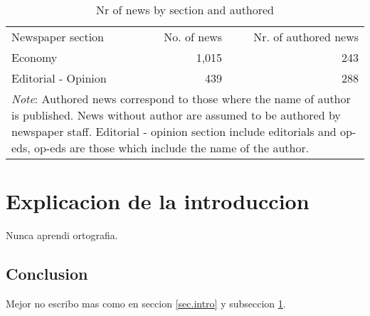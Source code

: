 \documentclass[13pt]{article}
\begin{document}
    \begin{table}[t]
        \centering
        \caption[Nr of news by section and authored]{Nr of news by section and authored}
        \begin{tabular}{lrr}
        \hline
        Newspaper section & No. of news & Nr. of authored news \\
        Economy & 1,015 & 243 \\
        Editorial - Opinion & 439 & 288 \\
        \hline
        \multicolumn{3}{p{0.40\textwidth}}{\footnotesize{\emph{Note}: Authored news correspond to those where the name of author is published. News without author are assumed to be authored by newspaper staff. Editorial - opinion section include editorials and op-eds, op-eds are those which include the name of the author.}}\\
        \end{tabular}
        \label{tab:news.description}
\end{table}

    \section{Explicacion de la introduccion}\label{sec.intro.explicacion}
        Nunca aprendi ortografia.

        \subsection{Conclusion}\label{sec.conclusion}
        Mejor no escribo mas como en seccion \ref{sec.intro} y subseccion \ref{sec.intro.explicacion}.
\end{document}
